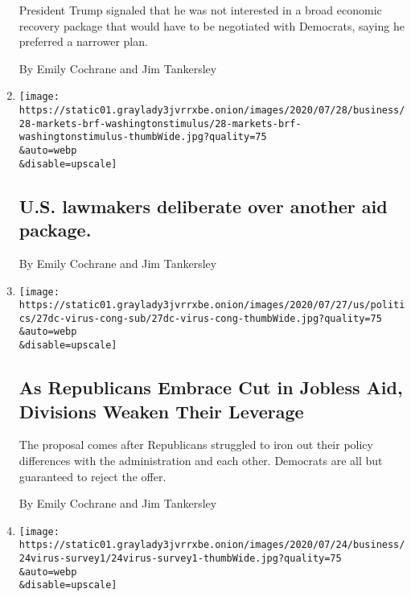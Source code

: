 \begin{enumerate}
  President Trump signaled that he was not interested in a broad
  economic recovery package that would have to be negotiated with
  Democrats, saying he preferred a narrower plan.

  By Emily Cochrane and Jim Tankersley
\item
  \href{/2020/07/28/business/us-lawmakers-deliberate-over-another-aid-package.html}{}

  \texttt{[image: https://static01.graylady3jvrrxbe.onion/images/2020/07/28/business/28-markets-brf-washingtonstimulus/28-markets-brf-washingtonstimulus-thumbWide.jpg?quality=75\\\&auto=webp\\\&disable=upscale]}

  \hypertarget{us-lawmakers-deliberate-over-another-aid-package}{%
  \subsection{U.S. lawmakers deliberate over another aid
  package.}\label{us-lawmakers-deliberate-over-another-aid-package}}

  By Emily Cochrane and Jim Tankersley
\item
  \href{/2020/07/27/us/politics/republicans-jobless-aid.html}{}

  \texttt{[image: https://static01.graylady3jvrrxbe.onion/images/2020/07/27/us/politics/27dc-virus-cong-sub/27dc-virus-cong-thumbWide.jpg?quality=75\\\&auto=webp\\\&disable=upscale]}

  \hypertarget{as-republicans-embrace-cut-in-jobless-aid-divisions-weaken-their-leverage}{%
  \subsection{As Republicans Embrace Cut in Jobless Aid, Divisions
  Weaken Their
  Leverage}\label{as-republicans-embrace-cut-in-jobless-aid-divisions-weaken-their-leverage}}

  The proposal comes after Republicans struggled to iron out their
  policy differences with the administration and each other. Democrats
  are all but guaranteed to reject the offer.

  By Emily Cochrane and Jim Tankersley
\item
  \href{/2020/07/24/business/economy/republicans-democrats-coronavirus-survey.html}{}

  \texttt{[image: https://static01.graylady3jvrrxbe.onion/images/2020/07/24/business/24virus-survey1/24virus-survey1-thumbWide.jpg?quality=75\\\&auto=webp\\\&disable=upscale]}


\end{enumerate}
